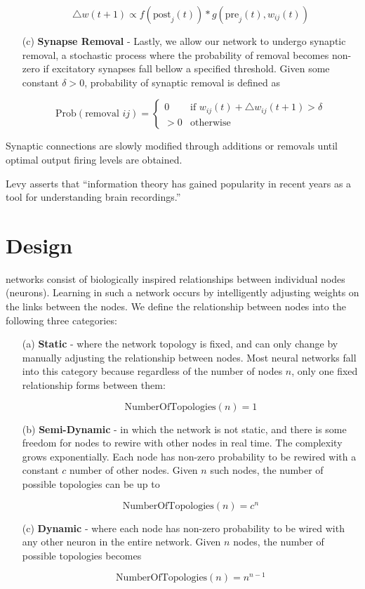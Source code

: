 \documentclass[journal]{./sty/IEEEtran}
\begin{document}
\begin{itemize}
\[
\triangle w(t+1) \propto f(\text{post}_j(t))*g(\text{pre}_j(t), w_{ij}(t))
\]

\item[(c)] {\bf Synapse Removal} -
Lastly, we allow our network to undergo synaptic removal, a stochastic process where the probability of removal becomes non-zero if excitatory synapses fall bellow a specified threshold.
Given some constant \(\delta > 0\), probability of synaptic removal is defined as

\[
\text{Prob}(\text{removal } ij) = \left\{
     \begin{array}{lr}
       0 & \text{if } w_{ij}(t) + \triangle w_{ij}(t+1) > \delta\\
       >0 & \text{otherwise}
     \end{array}
   \right.
\]

\end{itemize}

Synaptic connections are slowly modified through additions or removals until optimal output firing levels are obtained. 

Levy asserts that  ``information theory has gained popularity in recent years as a tool for understanding brain recordings.''


\section{Design}
 networks consist of biologically inspired relationships between individual nodes (neurons). Learning in such a network occurs by intelligently adjusting weights on the links between the nodes. We define the relationship between nodes into the following three categories:

\begin{itemize}
\item[(a)] {\bf Static} - where the network topology is fixed, and can only change by manually adjusting the relationship between nodes. Most neural networks fall into this category because regardless of the number of nodes \(n\), only one fixed relationship forms between them:

\[
\text{NumberOfTopologies}(n) = 1
\]


\item[(b)] {\bf Semi-Dynamic} - in which the network is not static, and there is some freedom for nodes to rewire with other nodes in real time. The complexity grows exponentially. Each node has non-zero probability to be rewired with a constant \(c\) number of other nodes. Given \(n\) such nodes, the number of possible topologies can be up to

\[
\text{NumberOfTopologies}(n) = c^n
\]


\item[(c)] {\bf Dynamic} - where each node has non-zero probability to be wired with any other neuron in the entire network. Given \(n\) nodes, the number of possible topologies becomes

\[
\text{NumberOfTopologies}(n) = n^{n-1}
\]


\end{itemize}
\end{document}
